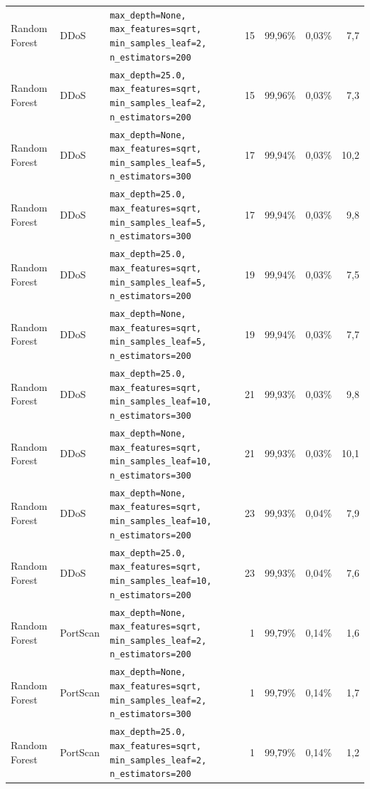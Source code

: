 {{\begin{tabularx}{\textwidth}{@{}llLrrrr@{}}
Random Forest & DDoS & \scriptsize\texttt{max\_depth=None, max\_features=sqrt, min\_samples\_leaf=2, n\_estimators=200} & 15 & 99,96\% & 0,03\% & 7,7\\
Random Forest & DDoS & \scriptsize\texttt{max\_depth=25.0, max\_features=sqrt, min\_samples\_leaf=2, n\_estimators=200} & 15 & 99,96\% & 0,03\% & 7,3\\
Random Forest & DDoS & \scriptsize\texttt{max\_depth=None, max\_features=sqrt, min\_samples\_leaf=5, n\_estimators=300} & 17 & 99,94\% & 0,03\% & 10,2\\
Random Forest & DDoS & \scriptsize\texttt{max\_depth=25.0, max\_features=sqrt, min\_samples\_leaf=5, n\_estimators=300} & 17 & 99,94\% & 0,03\% & 9,8\\
Random Forest & DDoS & \scriptsize\texttt{max\_depth=25.0, max\_features=sqrt, min\_samples\_leaf=5, n\_estimators=200} & 19 & 99,94\% & 0,03\% & 7,5\\
Random Forest & DDoS & \scriptsize\texttt{max\_depth=None, max\_features=sqrt, min\_samples\_leaf=5, n\_estimators=200} & 19 & 99,94\% & 0,03\% & 7,7\\
Random Forest & DDoS & \scriptsize\texttt{max\_depth=25.0, max\_features=sqrt, min\_samples\_leaf=10, n\_estimators=300} & 21 & 99,93\% & 0,03\% & 9,8\\
Random Forest & DDoS & \scriptsize\texttt{max\_depth=None, max\_features=sqrt, min\_samples\_leaf=10, n\_estimators=300} & 21 & 99,93\% & 0,03\% & 10,1\\
Random Forest & DDoS & \scriptsize\texttt{max\_depth=None, max\_features=sqrt, min\_samples\_leaf=10, n\_estimators=200} & 23 & 99,93\% & 0,04\% & 7,9\\
Random Forest & DDoS & \scriptsize\texttt{max\_depth=25.0, max\_features=sqrt, min\_samples\_leaf=10, n\_estimators=200} & 23 & 99,93\% & 0,04\% & 7,6\\
Random Forest & PortScan & \scriptsize\texttt{max\_depth=None, max\_features=sqrt, min\_samples\_leaf=2, n\_estimators=200} & 1 & 99,79\% & 0,14\% & 1,6\\
Random Forest & PortScan & \scriptsize\texttt{max\_depth=None, max\_features=sqrt, min\_samples\_leaf=2, n\_estimators=300} & 1 & 99,79\% & 0,14\% & 1,7\\
Random Forest & PortScan & \scriptsize\texttt{max\_depth=25.0, max\_features=sqrt, min\_samples\_leaf=2, n\_estimators=200} & 1 & 99,79\% & 0,14\% & 1,2\\

\end{tabularx}}}
